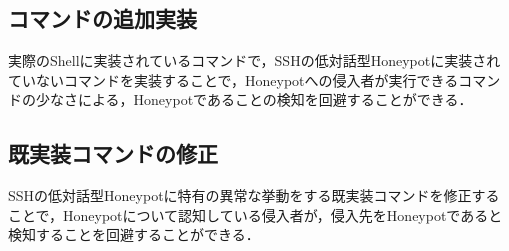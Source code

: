 \subsection{コマンドの追加実装}
\label{appr:addcommand}
実際のShellに実装されているコマンドで，SSHの低対話型Honeypotに実装されていないコマンドを実装することで，Honeypotへの侵入者が実行できるコマンドの少なさによる，Honeypotであることの検知を回避することができる．

\subsection{既実装コマンドの修正}
\label{appr:repaircommand}
SSHの低対話型Honeypotに特有の異常な挙動をする既実装コマンドを修正することで，Honeypotについて認知している侵入者が，侵入先をHoneypotであると検知することを回避することができる．



